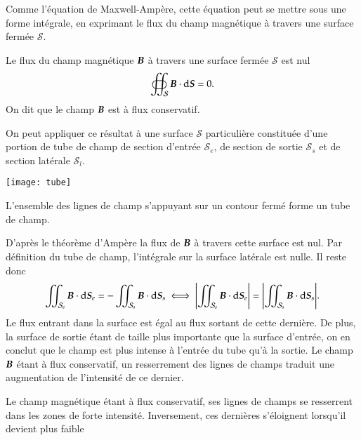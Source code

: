 Comme l'équation de Maxwell-Ampère, cette équation peut se mettre sous une forme
intégrale, en exprimant le flux du champ magnétique à travers une surface fermée
$\mathcal{S}$.

\begin{defn}
	Le flux du champ magnétique $\vecb$ à travers une surface fermée 
	$\mathcal{S}$ est nul
	\begin{equation*}
		\oiint_\mathcal{S} \vecb \cdot \ds = 0.
	\end{equation*}
	On dit que le champ $\vecb$ est à flux conservatif.
\end{defn}

	\begin{minipage}{0.6\linewidth}
	On peut appliquer ce résultat à une surface $\mathcal{S}$ particulière
	constituée d'une portion de tube de champ de section d'entrée $\mathcal{S}_e$,
	de section de sortie $\mathcal{S}_s$ et de section latérale $
	\mathcal{S}_l$. 	
	\end{minipage}
	\hfill
	\begin{minipage}{0.3\linewidth}
	\texttt{[image: tube]}
	\end{minipage}
	\vspace{0.5cm}

\begin{defn}
	L'ensemble des lignes de champ s'appuyant sur un contour fermé forme un 
	tube de champ.
\end{defn}
	
	D'après le théorème d'Ampère la flux de $\vecb$ à
	travers cette surface est nul.
	Par définition du tube de champ, l'intégrale sur la surface 
	latérale est nulle. Il reste donc 
	\begin{equation*}
		\iint_{\mathcal{S}_e} \vecb \cdot \ds_e =
		- \iint_{\mathcal{S}_s} \vecb \cdot \ds_s 
		\iff
		\displaystyle{\left\lvert\iint_{\mathcal{S}_e} \vecb \cdot \ds_e\right\rvert =
		\left\lvert\iint_{\mathcal{S}_s} \vecb \cdot \ds_s\right\rvert}.
	\end{equation*}
	Le flux entrant dans la surface est égal au flux sortant de cette dernière.
	De plus, la surface de sortie étant de taille plus importante que 
	la surface d'entrée, on en conclut que le champ est plus intense
	à l'entrée du tube qu'à la sortie. Le champ $\vecb$ étant à flux
	conservatif, un resserrement des lignes de champs traduit une augmentation
	de l'intensité de ce dernier.

\begin{defn}
	Le champ magnétique étant à flux conservatif, ses lignes de champs
	se resserrent dans les zones de forte intensité. Inversement, ces dernières
	s'éloignent lorsqu'il devient plus faible
\end{defn}

